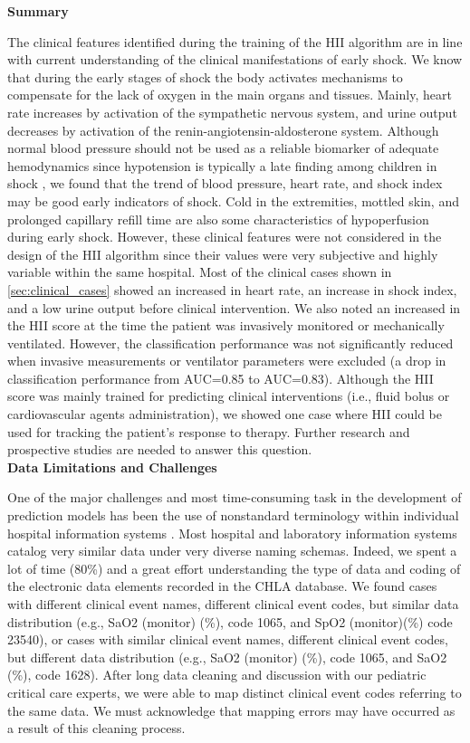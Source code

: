 \documentclass[
   technote
]{phildoc}
\newcommand{\ie}{i.e.,}
\newcommand{\eg}{e.g.,}
\newcommand{\hii}{HII}
\begin{document}
\noindent\textbf{Summary}

The clinical features identified during the training of the \hii{} algorithm are in line with current understanding of the clinical manifestations of early shock. We know that during the early stages of shock the body activates mechanisms to compensate for the lack of oxygen in the main organs and tissues. Mainly, heart rate increases by activation of the sympathetic nervous system, and urine output decreases by activation of the renin-angiotensin-aldosterone system. Although normal blood pressure should not be used as a reliable biomarker of adequate hemodynamics since hypotension is typically a late finding among children in shock \citep{Sinniah:2012}, we found that the trend of blood pressure, heart rate, and shock index may be good early indicators of shock.  Cold in the extremities, mottled skin, and prolonged capillary refill time are also some characteristics of hypoperfusion during early shock. However, these clinical features were not considered in the design of the \hii{} algorithm since their values were very subjective and highly variable within the same hospital. Most of the clinical cases shown in \ref{sec:clinical_cases} showed an increased in heart rate, an increase in shock index, and a low urine output before clinical intervention. We also noted an increased in the \hii{} score at the time the patient was invasively monitored or mechanically ventilated. However, the classification performance was not significantly reduced when invasive measurements or ventilator parameters were excluded (a drop in classification performance from AUC=0.85 to AUC=0.83). Although the \hii{} score was mainly trained for predicting clinical interventions (\ie{} fluid bolus or cardiovascular agents administration), we showed one case where \hii{} could be used for tracking the patient's response to therapy. Further research and prospective studies are needed to answer this question.\\           

\noindent\textbf{Data Limitations and Challenges}

One of the major challenges and most time-consuming task in the development of prediction models has been the use of nonstandard terminology within individual hospital information systems \cite{Frassica:2005}. Most hospital and laboratory information systems catalog very similar data under very diverse naming schemas. Indeed, we spent a lot of time (80\%) and a great effort understanding the type of data and coding of the electronic data elements recorded in the CHLA database. We found cases with different clinical event names, different clinical event codes, but similar data distribution (\eg{} SaO2 (monitor) (\%), code 1065, and SpO2 (monitor)(\%) code 23540), or cases with similar clinical event names, different clinical event codes, but different data distribution (\eg{} SaO2 (monitor) (\%), code 1065, and SaO2 (\%), code 1628). After long data cleaning and discussion with our pediatric critical care experts, we were able to map distinct clinical event codes referring to the same data. We must acknowledge that mapping errors may have occurred as a result of this cleaning process.    
\end{document}
